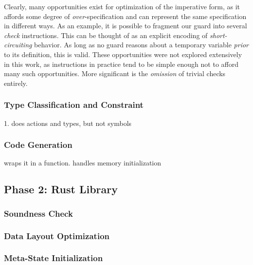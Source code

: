 Clearly, many opportunities exist for optimization of the imperative form, as it affords some degree of \textit{over}-specification and can represent the same specification in different ways. As an example, it is possible to fragment our guard into several \textit{check} instructions. This can be thought of as an explicit encoding of \textit{short-circuiting} behavior. As long as no guard reasons about a temporary variable \textit{prior} to its definition, this is valid. These opportunities were not explored extensively in this work, as instructions in practice tend to be simple enough not to afford many such opportunities. More significant is the \textit{omission} of trivial checks entirely. 

\subsubsection{Type Classification and Constraint}
1. does actions and types, but not symbols
\subsubsection{Code Generation}
wraps it in a function. handles memory initialization

\subsection{Phase 2: Rust Library}
\label{sec:translation_phase_2}

\subsubsection{Soundness Check}

\subsubsection{Data Layout Optimization}
\subsubsection{Meta-State Initialization}